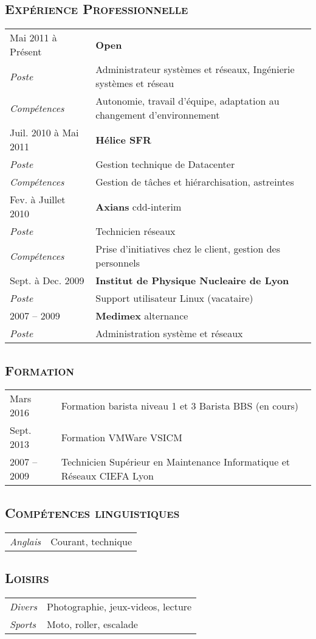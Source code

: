 \documentclass[a4paper]{article}
\newcommand{\hsubsection}[1]{\subsection*{\fontfamily{phv}\selectfont\textsc{#1}}}
\begin{document}
\hsubsection{Expérience Professionnelle}
\begin{tabular}{P{3.5cm}|p{13cm}}
Mai 2011 à Présent	& \textbf{Open}\\
\textsl{Poste}		& Administrateur systèmes et réseaux, Ingénierie systèmes et réseau\\
\textsl{Compétences}		& Autonomie, travail d’équipe, adaptation au changement d’environnement\\
Juil. 2010 à Mai 2011 	& \textbf{Hélice SFR}\\
\textsl{Poste} 		& Gestion technique de Datacenter\\
\textsl{Compétences}	& Gestion de tâches et hiérarchisation, astreintes\\
Fev. à Juillet 2010 	& \textbf{Axians} cdd-interim\\
\textsl{Poste} 		& Technicien réseaux\\
\textsl{Compétences}	& Prise d’initiatives chez le client, gestion des personnels\\
Sept. à Dec. 2009 	& \textbf{Institut de Physique Nucleaire de Lyon}\\
\textsl{Poste} 		& Support utilisateur Linux (vacataire)\\
2007 – 2009 		& \textbf{Medimex} alternance\\
\textsl{Poste} 		& Administration système et réseaux\\
\end{tabular}

\hsubsection{Formation}
\begin{tabular}{P{3.5cm}|p{13cm}}
Mars 2016		& Formation barista niveau 1 et 3 Barista BBS (en cours)\\
Sept. 2013		& Formation VMWare VSICM\\
2007 – 2009		& Technicien Supérieur en Maintenance Informatique et Réseaux CIEFA Lyon\\
\end{tabular}

\hsubsection{Compétences linguistiques}
\begin{tabular}{P{3.5cm}|p{13cm}}
\textsl{Anglais}		& Courant, technique\\
\end{tabular}

\hsubsection{Loisirs}
\begin{tabular}{P{3.5cm}|p{13cm}}
\textsl{Divers}			& Photographie, jeux-videos, lecture\\
\textsl{Sports}			& Moto, roller, escalade\\
\end{tabular}
\end{document}
